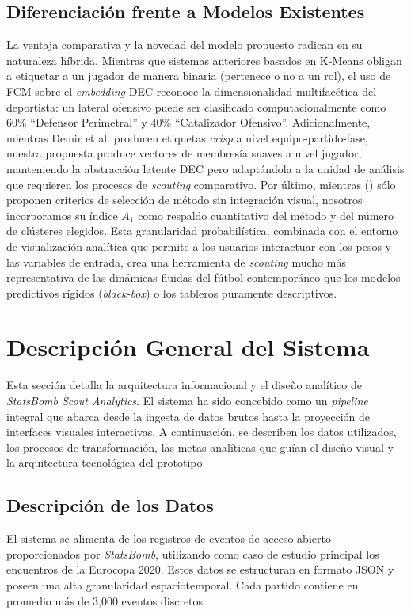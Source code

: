 \documentclass[conference]{IEEEtran}
\begin{document}
\subsection{Diferenciación frente a Modelos Existentes}
La ventaja comparativa y la novedad del modelo propuesto radican en su naturaleza híbrida. Mientras que sistemas anteriores basados en K-Means obligan a etiquetar a un jugador de manera binaria (pertenece o no a un rol), el uso de FCM sobre el \textit{embedding} DEC reconoce la dimensionalidad multifacética del deportista: un lateral ofensivo puede ser clasificado computacionalmente como $60\%$ ``Defensor Perimetral'' y $40\%$ ``Catalizador Ofensivo''. Adicionalmente, mientras Demir et al. \citep{demir2026how} producen etiquetas \textit{crisp} a nivel equipo-partido-fase, nuestra propuesta produce vectores de membresía suaves a nivel jugador, manteniendo la abstracción latente DEC pero adaptándola a la unidad de análisis que requieren los procesos de \textit{scouting} comparativo. Por último, mientras \citeauthor{akhanli2022clustering} (\citeyear{akhanli2022clustering}) sólo proponen criterios de selección de método sin integración visual, nosotros incorporamos su índice $A_1$ como respaldo cuantitativo del método y del número de clústeres elegidos. Esta granularidad probabilística, combinada con el entorno de visualización analítica que permite a los usuarios interactuar con los pesos y las variables de entrada, crea una herramienta de \textit{scouting} mucho más representativa de las dinámicas fluidas del fútbol contemporáneo que los modelos predictivos rígidos (\textit{black-box}) o los tableros puramente descriptivos.


\section{Descripción General del Sistema}

Esta sección detalla la arquitectura informacional y el diseño analítico de \textit{StatsBomb Scout Analytics}. El sistema ha sido concebido como un \textit{pipeline} integral que abarca desde la ingesta de datos brutos hasta la proyección de interfaces visuales interactivas. A continuación, se describen los datos utilizados, los procesos de transformación, las metas analíticas que guían el diseño visual y la arquitectura tecnológica del prototipo.

\subsection{Descripción de los Datos}
El sistema se alimenta de los registros de eventos de acceso abierto proporcionados por \textit{StatsBomb}, utilizando como caso de estudio principal los encuentros de la Eurocopa 2020. Estos datos se estructuran en formato JSON y poseen una alta granularidad espaciotemporal. Cada partido contiene en promedio más de 3,000 eventos discretos. 
\end{document}
